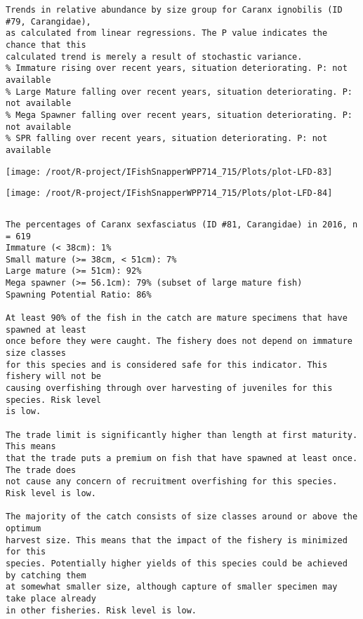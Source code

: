 \documentclass{report}\usepackage[]{graphicx}\usepackage[]{color}
\makeatletter
\def\maxwidth{ %
  \ifdim\Gin@nat@width>\linewidth
    \linewidth
  \else
    \Gin@nat@width
  \fi
}
\newenvironment{kframe}{%
 \def\at@end@of@kframe{}%
 \ifinner\ifhmode%
  \def\at@end@of@kframe{\end{minipage}}%
  \begin{minipage}{\columnwidth}%
 \fi\fi%
 \def\FrameCommand##1{\hskip\@totalleftmargin \hskip-\fboxsep
 \colorbox{shadecolor}{##1}\hskip-\fboxsep
     \hskip-\linewidth \hskip-\@totalleftmargin \hskip\columnwidth}%
 \MakeFramed {\advance\hsize-\width
   \@totalleftmargin\z@ \linewidth\hsize
   \@setminipage}}%
 {\par\unskip\endMakeFramed%
 \at@end@of@kframe}
\newenvironment{knitrout}{}{} %
\makeatother
\begin{document}
\begin{knitrout}
\begin{kframe}
\begin{verbatim}
Trends in relative abundance by size group for Caranx ignobilis (ID #79, Carangidae),
as calculated from linear regressions. The P value indicates the chance that this
calculated trend is merely a result of stochastic variance.
% Immature rising over recent years, situation deteriorating. P: not available
% Large Mature falling over recent years, situation deteriorating. P: not available
% Mega Spawner falling over recent years, situation deteriorating. P: not available
% SPR falling over recent years, situation deteriorating. P: not available
\end{verbatim}
\end{kframe}
\texttt{[image: /root/R-project/IFishSnapperWPP714\_715/Plots/plot-LFD-83]} 

\texttt{[image: /root/R-project/IFishSnapperWPP714\_715/Plots/plot-LFD-84]} 
\begin{kframe}\begin{verbatim}
\end{verbatim}
\end{kframe}
\clearpage
\newpage
\begin{kframe}\begin{verbatim}The percentages of Caranx sexfasciatus (ID #81, Carangidae) in 2016, n = 619
Immature (< 38cm): 1%
Small mature (>= 38cm, < 51cm): 7%
Large mature (>= 51cm): 92%
Mega spawner (>= 56.1cm): 79% (subset of large mature fish)
Spawning Potential Ratio: 86%
 
At least 90% of the fish in the catch are mature specimens that have spawned at least
once before they were caught. The fishery does not depend on immature size classes
for this species and is considered safe for this indicator. This fishery will not be
causing overfishing through over harvesting of juveniles for this species. Risk level
is low.

The trade limit is significantly higher than length at first maturity.  This means
that the trade puts a premium on fish that have spawned at least once. The trade does
not cause any concern of recruitment overfishing for this species. Risk level is low.

The majority of the catch consists of size classes around or above the optimum
harvest size. This means that the impact of the fishery is minimized for this
species. Potentially higher yields of this species could be achieved by catching them
at somewhat smaller size, although capture of smaller specimen may take place already
in other fisheries. Risk level is low.


\end{verbatim}
\end{kframe}
\end{knitrout}
\end{document}
